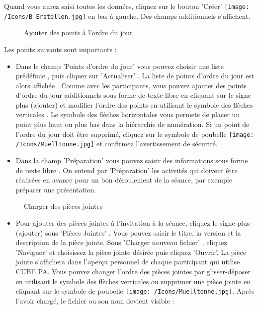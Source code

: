Quand vous aurez saisi toutes les données, cliquez sur le bouton 'Créer' \texttt{[image: /Icons/B\_Erstellen.jpg]} en bas à gauche. Des champs additionnels s'affichent.

\begin{figure}[H]
\caption{Ajouter des points à l'ordre du jour}
\end{figure}

Les points suivants sont importants :

\begin{itemize}
\item 
Dans le champ 'Points d'ordre du jour' vous pouvez choisir une liste prédéfinie , puis cliquer sur 'Actualiser' . La liste de points d'ordre du jour est alors affichée . Comme avec les participants, vous pouvez ajouter des points d'ordre du jour additionnels sous forme de texte libre en cliquant sur le signe plus (ajouter)  et modifier l'ordre des points en utilisant le symbole des flèches verticales . Le symbole des flèches horizontales  vous permets de placer un point plus haut ou plus bas dans la hiérarchie de numération. Si un point de l'ordre du jour doit être supprimé, cliquez sur le symbole de poubelle \texttt{[image: /Icons/Muelltonne.jpg]}  et confirmez l'avertissement de sécurité.
\item 
Dans la champ 'Préparation' vous pouvez saisir des informations sous forme de texte libre . On entend par 'Préparation' les activités qui doivent être réalisées en avance pour un bon déroulement de la séance, par exemple préparer une présentation.
\end{itemize}

\begin{figure}[H]
\caption{Charger des pièces jointes}
\end{figure}

\begin{itemize}
\item 
Pour ajouter des pièces jointes à l'invitation à la séance, cliquez le signe plus (ajouter) sous 'Pièces Jointes' . Vous pouvez saisir le titre, la version et la description de la pièce jointe. Sous 'Charger nouveau fichier' , cliquez 'Naviguer' et choisissez la pièce jointe désirée puis cliquez 'Ouvrir'. La pièce jointe s'affichera dans l'aperçu personnel de chaque participant qui utilise CUBE PA. Vous pouvez changer l'ordre des pièces jointes par glisser-déposer en utilisant le symbole des flèches verticales ou supprimer une pièce jointe en cliquant sur le symbole de poubelle \texttt{[image: /Icons/Muelltonne.jpg]}. Après l'avoir chargé, le fichier ou son nom devient visible :
\end{itemize}

